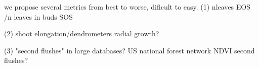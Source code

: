 \documentclass{article}
\begin{document}
	we propose several metrics from best to worse, dificult to easy.
	(1) nleaves  EOS /n leaves in buds SOS
	
	(2) shoot elongation/dendrometers radial growth? 
	
	(3) "second flushes" in large databases? US national forest network 
	NDVI second flushes?
	
	


	
	

	
	\pagebreak
	

	

	

	
	\newpage
	
	
	
	
	
	
\end{document}
